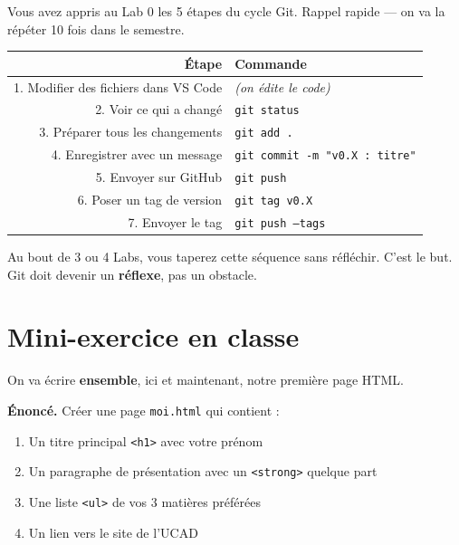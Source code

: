 \documentclass[11pt,a4paper]{article}
\begin{document}
Vous avez appris au Lab 0 les 5 étapes du cycle Git. Rappel rapide --- on
va la répéter 10 fois dans le semestre.

\begin{center}
\begin{tabular}{@{}rl@{}}
\toprule
\textbf{Étape} & \textbf{Commande} \\
\midrule
1. Modifier des fichiers dans VS Code & \emph{(on édite le code)} \\
2. Voir ce qui a changé                & \texttt{git status} \\
3. Préparer tous les changements       & \texttt{git add .} \\
4. Enregistrer avec un message         & \texttt{git commit -m "v0.X : titre"} \\
5. Envoyer sur GitHub                  & \texttt{git push} \\
6. Poser un tag de version             & \texttt{git tag v0.X} \\
7. Envoyer le tag                      & \texttt{git push --tags} \\
\bottomrule
\end{tabular}
\end{center}

\begin{retenirbox}
Au bout de 3 ou 4 Labs, vous taperez cette séquence sans réfléchir. C'est
le but. Git doit devenir un \textbf{réflexe}, pas un obstacle.
\end{retenirbox}

\section{Mini-exercice en classe}

\begin{objectifbox}
On va écrire \textbf{ensemble}, ici et maintenant, notre première page HTML.

\medskip

\textbf{Énoncé.} Créer une page \texttt{moi.html} qui contient :
\begin{enumerate}[nosep]
    \item Un titre principal \texttt{<h1>} avec votre prénom
    \item Un paragraphe de présentation avec un \texttt{<strong>} quelque part
    \item Une liste \texttt{<ul>} de vos 3 matières préférées
    \item Un lien vers le site de l'UCAD
\end{enumerate}
\end{objectifbox}
\end{document}
